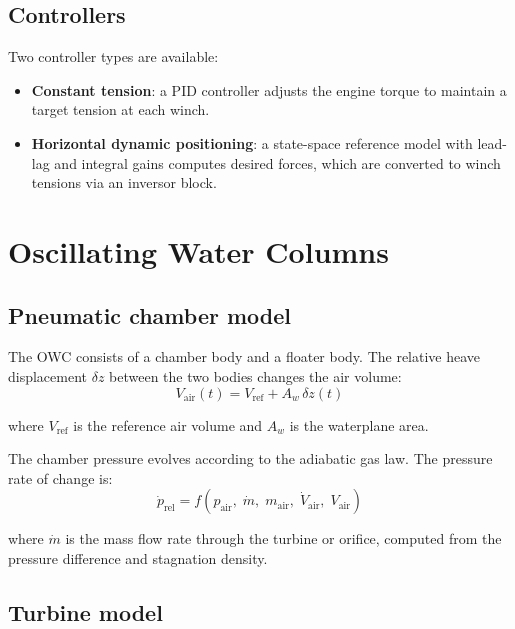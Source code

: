 \documentclass[11pt]{article}
\begin{document}
\subsection{Controllers}

Two controller types are available:
\begin{itemize}
    \item \textbf{Constant tension}: a PID controller adjusts the engine torque to maintain a target tension at each winch.
    \item \textbf{Horizontal dynamic positioning}: a state-space reference model with lead-lag and integral gains computes desired forces, which are converted to winch tensions via an inversor block.
\end{itemize}


\section{Oscillating Water Columns}
\label{sec:owc}

\subsection{Pneumatic chamber model}

The OWC consists of a chamber body and a floater body. The relative heave displacement $\delta z$ between the two bodies changes the air volume:
\begin{equation}
V_{\text{air}}(t) = V_{\text{ref}} + A_w\,\delta z(t)
\end{equation}

where $V_{\text{ref}}$ is the reference air volume and $A_w$ is the waterplane area.

The chamber pressure evolves according to the adiabatic gas law. The pressure rate of change is:
\begin{equation}
\dot{p}_{\text{rel}} = f\left(p_{\text{air}},\; \dot{m},\; m_{\text{air}},\; \dot{V}_{\text{air}},\; V_{\text{air}}\right)
\end{equation}

where $\dot{m}$ is the mass flow rate through the turbine or orifice, computed from the pressure difference and stagnation density.

\subsection{Turbine model}
\end{document}
